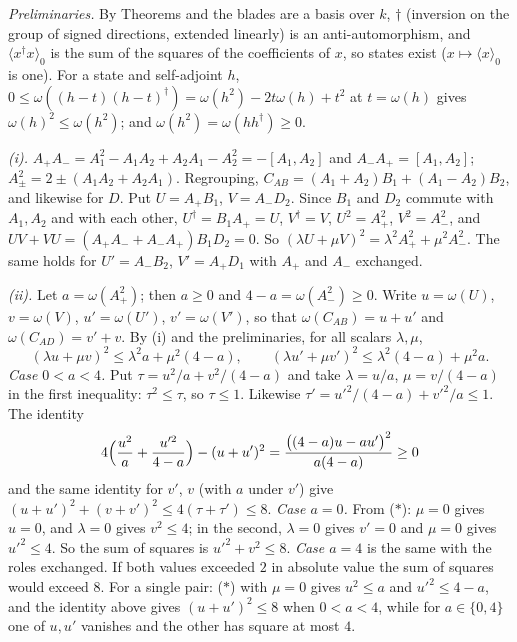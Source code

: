 \emph{Preliminaries.} By Theorems  and  the blades are a basis over $k$, $\dagger$ (inversion on the group of signed directions, extended linearly) is an anti-automorphism, and $\langle x^{\dagger}x\rangle_{0}$ is the sum of the squares of the coefficients of $x$, so states exist ($x \mapsto \langle x\rangle_{0}$ is one). For a state and self-adjoint $h$, $0 \le \omega((h - t)(h - t)^{\dagger}) = \omega(h^{2}) - 2t\omega(h) + t^{2}$ at $t = \omega(h)$ gives $\omega(h)^{2} \le \omega(h^{2})$; and $\omega(h^{2}) = \omega(hh^{\dagger}) \ge 0$.

\emph{(i).} $A_{+}A_{-} = A_{1}^{2} - A_{1}A_{2} + A_{2}A_{1} - A_{2}^{2} = -[A_{1},A_{2}]$ and $A_{-}A_{+} = [A_{1},A_{2}]$; $A_{\pm}^{2} = 2 \pm (A_{1}A_{2} + A_{2}A_{1})$. Regrouping, $C_{AB} = (A_{1} + A_{2})B_{1} + (A_{1} - A_{2})B_{2}$, and likewise for $D$. Put $U = A_{+}B_{1}$, $V = A_{-}D_{2}$. Since $B_{1}$ and $D_{2}$ commute with $A_{1}, A_{2}$ and with each other, $U^{\dagger} = B_{1}A_{+} = U$, $V^{\dagger} = V$, $U^{2} = A_{+}^{2}$, $V^{2} = A_{-}^{2}$, and $UV + VU = (A_{+}A_{-} + A_{-}A_{+})B_{1}D_{2} = 0$. So $(\lambda U + \mu V)^{2} = \lambda^{2}A_{+}^{2} + \mu^{2}A_{-}^{2}$. The same holds for $U' = A_{-}B_{2}$, $V' = A_{+}D_{1}$ with $A_{+}$ and $A_{-}$ exchanged.

\emph{(ii).} Let $a = \omega(A_{+}^{2})$; then $a \ge 0$ and $4 - a = \omega(A_{-}^{2}) \ge 0$. Write $u = \omega(U)$, $v = \omega(V)$, $u' = \omega(U')$, $v' = \omega(V')$, so that $\omega(C_{AB}) = u + u'$ and $\omega(C_{AD}) = v' + v$. By (i) and the preliminaries, for all scalars $\lambda, \mu$,
\[
(\lambda u + \mu v)^{2} \le \lambda^{2}a + \mu^{2}(4 - a), \qquad (\lambda u' + \mu v')^{2} \le \lambda^{2}(4 - a) + \mu^{2}a . \tag{$*$}
\]
\emph{Case $0 < a < 4$.} Put $\tau = u^{2}/a + v^{2}/(4 - a)$ and take $\lambda = u/a$, $\mu = v/(4 - a)$ in the first inequality: $\tau^{2} \le \tau$, so $\tau \le 1$. Likewise $\tau' = u'^{2}/(4 - a) + v'^{2}/a \le 1$. The identity
\[
4\Bigl(\frac{u^{2}}{a} + \frac{u'^{2}}{4 - a}\Bigr) - (u + u')^{2} = \frac{\bigl((4 - a)u - au'\bigr)^{2}}{a(4 - a)} \ge 0
\]
and the same identity for $v'$, $v$ (with $a$ under $v'$) give $(u + u')^{2} + (v + v')^{2} \le 4(\tau + \tau') \le 8$. \emph{Case $a = 0$.} From ($*$): $\mu = 0$ gives $u = 0$, and $\lambda = 0$ gives $v^{2} \le 4$; in the second, $\lambda = 0$ gives $v' = 0$ and $\mu = 0$ gives $u'^{2} \le 4$. So the sum of squares is $u'^{2} + v^{2} \le 8$. \emph{Case $a = 4$} is the same with the roles exchanged. If both values exceeded $2$ in absolute value the sum of squares would exceed $8$. For a single pair: ($*$) with $\mu = 0$ gives $u^{2} \le a$ and $u'^{2} \le 4 - a$, and the identity above gives $(u + u')^{2} \le 8$ when $0 < a < 4$, while for $a \in \{0, 4\}$ one of $u, u'$ vanishes and the other has square at most $4$.

